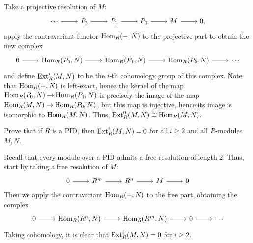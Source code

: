 \documentclass[../../master.tex]{subfiles}
\begin{document}
\begin{solution}
    Take a projective resolution of $M$:
    \[
    \begin{tikzcd}
        \cdots & P_2 & P_1 & P_0 & M & 0,
        \arrow[from=1-1, to=1-2]
        \arrow[from=1-2, to=1-3]
        \arrow[from=1-3, to=1-4]
        \arrow[from=1-4, to=1-5]
        \arrow[from=1-5, to=1-6] 
    \end{tikzcd}
    \]
    apply the contravariant functor $\operatorname{Hom}_R(-, N)$ to the projective part to obtain the new complex
    \[
    \begin{tikzcd}
        0 & \Hom_R(P_0, N) & \Hom_R(P_1, N) & \Hom_R(P_2, N) & \cdots
        \arrow[from=1-1, to=1-2]
        \arrow[from=1-2, to=1-3]
        \arrow[from=1-3, to=1-4]
        \arrow[from=1-4, to=1-5]
    \end{tikzcd}
    \]
    and define $\operatorname{Ext}_R^{i}(M, N)$ to be the $i$-th cohomology group of this complex.
    Note that $\operatorname{Hom}_R(-, N)$ is left-exact, hence the kernel of the map $\operatorname{Hom}_R(P_0, N) \to \operatorname{Hom}_R(P_1, N)$ is precisely the image of the map $\operatorname{Hom}_R(M, N) \to \operatorname{Hom}_R(P_0, N)$, but this map is injective, hence its image is isomorphic to $\operatorname{Hom}_R(M, N)$.
    Thus, $\operatorname{Ext}_R^{0}(M, N) \cong \operatorname{Hom}_R(M, N)$.
\end{solution}

\begin{problem}
    Prove that if $R$ is a PID, then $\operatorname{Ext}_R^{i}(M, N) = 0$ for all $i \geq 2$ and all $R$-modules $M, N$.
\end{problem}

\begin{solution}
    Recall that every module over a PID admits a free resolution of length 2.
    Thus, start by taking a free resolution of $M$:
    \[
    \begin{tikzcd}
        0 & R^{m} & R^{n} & M & 0
        \arrow[from=1-1, to=1-2]
        \arrow[from=1-2, to=1-3]
        \arrow[from=1-3, to=1-4]
        \arrow[from=1-4, to=1-5]
    \end{tikzcd}
    \]
    Then we apply the contravariant $\operatorname{Hom}_R(-, N)$ to the free part, obtaining the complex
    \[
    \begin{tikzcd}
        0 & \Hom_R(R^{n}, N) & \Hom_R(R^{m}, N) & 0 & \cdots
        \arrow[from=1-1, to=1-2]
        \arrow[from=1-2, to=1-3]
        \arrow[from=1-3, to=1-4]
        \arrow[from=1-4, to=1-5]
    \end{tikzcd}
    \]
    Taking cohomology, it is clear that $\operatorname{Ext}_R^{i}(M, N) = 0$ for $i \geq 2$.
\end{solution}
\end{document}
